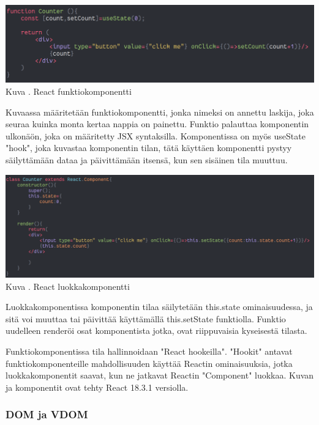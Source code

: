 \bigskip
\includegraphics[width=15cm]{src/public/oppar/function_component.png}\\
Kuva \getImgCount{}. React funktiokomponentti
\medskip

Kuvaassa \theimgCounter{} määritetään funktiokomponentti, jonka nimeksi on annettu laskija, joka seuraa kuinka monta kertaa nappia on painettu.
Funktio palauttaa komponentin ulkonäön, joka on määritetty JSX syntaksilla.
Komponentissa on myös useState "hook"{}, joka kuvastaa komponentin tilan,
tätä käyttäen komponentti pystyy säilyttämään dataa ja päivittämään itsensä, kun sen sisäinen tila muuttuu.
\medskip




\bigskip
\includegraphics[width=15cm]{src/public/oppar/class_.png}\\
Kuva \getImgCount{}. React luokkakomponentti
\medskip



Luokkakomponentissa komponentin tilaa säilytetään this.state ominaisuudessa, ja sitä voi muuttaa tai päivittää käyttämällä this.setState funktiolla. 
Funktio uudelleen renderöi osat komponentista jotka, ovat riippuvaisia kyseisestä tilasta.
\medskip


Funktiokomponentissa tila hallinnoidaan "React hookeilla"{}. 
"Hookit"{} antavat funktiokomponenteille mahdollisuuden käyttää Reactin ominaisuuksia, 
jotka luokkakomponentit saavat, kun ne jatkavat Reactin "Component"{} luokkaa.
Kuvan \prevImageCount{} ja \theimgCounter{} komponentit ovat tehty React 18.3.1 versiolla.
\medskip



\subsubsection{DOM ja VDOM}



